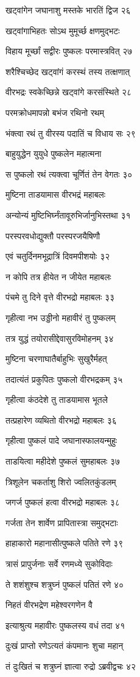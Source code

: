 खट्वांगेन जघानाशु मस्तके भारतिं द्विज २६

खट्वांगाभिहतः सोऽथ मुमूर्च्छ क्षणमुद्भटः

विहाय मूर्च्छां सद्वीरः पुष्कलः परमास्त्रवित् २७

शरैश्चिच्छेद खट्वांगं करस्थं तस्य तत्क्षणात्

वीरभद्रः स्वकेच्छिन्ने खट्वांगे करसंस्थिते २८

परमक्रोधमापन्नो बभंज रथिनो रथम्

भंक्त्वा रथं तु वीरस्य पदातिं च विधाय सः २९

बाहुयुद्धेन युयुधे पुष्कलेन महात्मना

स पुष्कलो रथं त्यक्त्वा चूर्णितं तेन वेगतः ३०

मुष्टिना ताडयामास वीरभद्रं महाबलः

अन्योन्यं मुष्टिभिर्घ्नंतावूरुभिर्जानुभिस्तथा ३१

परस्परवधोद्युक्तौ परस्परजयैषिणौ

एवं चतुर्दिनमभूद्रात्रिं दिवमपीशयोः ३२

न कोपि तत्र हीयेत न जीयेत महाबलः

पंचमे तु दिने वृत्ते वीरभद्रो महाबलः ३३

गृहीत्वा नभ उड्डीनो महावीरं तु पुष्कलम्

तत्र युद्धं तयोरासीद्देवासुरविमोहनम् ३४

मुष्टिना चरणाघातैर्बाहुभिः सुखुरैर्महत्

तदात्यंतं प्रकुपितः पुष्कलो वीरभद्रकम् ३५

गृहीत्वा कंठदेशे तु ताडयामास भूतले

तत्प्रहारेण व्यथितो वीरभद्रो महाबलः ३६

गृहीत्वा पुष्कलं पादे जघानास्फालयन्मुहुः

ताडयित्वा महीदेशे पुष्कलं सुमहाबलः ३७

त्रिशूलेन चकर्ताशु शिरो ज्वलितकुंडलम्

जगर्ज पुष्कलं हत्वा वीरभद्रो महाबलः ३८

गर्जता तेन शार्वेण प्रापितास्त्रा समुद्भटाः

हाहाकारो महानासीत्पुष्कले पतिते रणे ३९

त्रासं प्रापुर्जनाः सर्वे रणमध्ये सुकोविदाः

ते शशंशुश्च शत्रुघ्नं पुष्कलं पतितं रणे ४०

निहतं वीरभद्रेण महेश्वरगणेन वै

इत्याश्रुत्य महावीरः पुष्कलस्य वधं तदा ४१

दुःखं प्राप्तो रणेऽत्यतं कंपमानः शुचा महान्

तं दुःखितं च शत्रुघ्नं ज्ञात्वा रुद्रो ऽब्रवीद्वचः ४२

